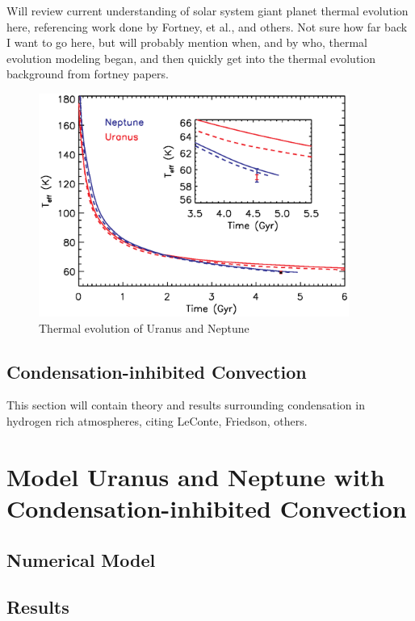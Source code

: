 \documentclass[11pt]{ucscthesisbs}
\begin{document}
Will review current understanding of solar system giant planet thermal evolution here, referencing work done by Fortney, et al., and others. Not sure how far back I want to go here, but will probably mention when, and by who, thermal evolution modeling began, and then quickly get into the thermal evolution background from fortney papers.

\begin{figure}[ht!]
 \centerline{
  \includegraphics[width=4.0in]{figures/f10.eps}
 }
\caption[This is just a placeholder for our own plot]
{Thermal evolution of Uranus and Neptune 
}

\label{fig:discretescan}
\end{figure}


\section{Condensation-inhibited Convection}\label{condensation_background}

This section will contain theory and results surrounding condensation in hydrogen rich atmospheres, citing LeConte, Friedson, others.


\chapter{Model Uranus and Neptune with Condensation-inhibited Convection}

\section{Numerical Model}

\section{Results}
\end{document}
